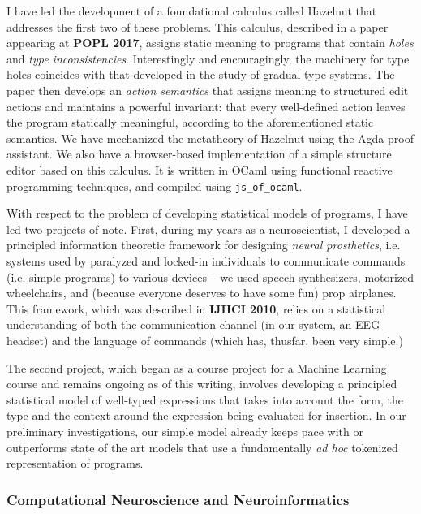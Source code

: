 \documentclass[10pt]{article}
\let\li\lstinline
\begin{document}
I have led the development of a foundational calculus called Hazelnut that addresses the first two of these problems. This calculus, described in a paper appearing at \textbf{POPL 2017}, assigns static meaning to programs that contain \emph{holes} and \emph{type inconsistencies}. Interestingly and encouragingly, the machinery for type holes coincides with that developed in the study of gradual type systems. The paper then develops an \emph{action semantics} that assigns meaning to structured edit actions and maintains a powerful invariant: that every well-defined action leaves the program statically meaningful, according to the aforementioned static semantics. We have mechanized the metatheory of Hazelnut using the Agda proof assistant. We also have a browser-based implementation of a simple {structure editor} based on this calculus. It is written in OCaml using functional reactive programming techniques, and compiled using \li{js_of_ocaml}.

With respect to the problem of developing statistical models of programs, I have led two projects of note. 
First, during my years as a neuroscientist, I developed a principled information theoretic framework for designing \emph{neural prosthetics}, i.e. systems used by paralyzed and locked-in individuals to communicate commands (i.e. simple programs) to various devices -- we used speech synthesizers, motorized wheelchairs, and (because everyone deserves to have some fun) prop airplanes. This framework, which was described in \textbf{IJHCI 2010}, relies on a statistical understanding of both the communication channel (in our system, an EEG headset) and  the language of commands (which has, thusfar, been very simple.)

The second project, which began as a course project for a Machine Learning course and remains ongoing as of this writing, involves developing a principled statistical model of well-typed expressions that takes into account the form, the type and the context around the expression being evaluated for insertion. In our preliminary investigations, our simple model already keeps pace with or outperforms state of the art models that use a fundamentally \emph{ad hoc} tokenized representation of programs. %



\subsubsection*{Computational Neuroscience and Neuroinformatics}
\end{document}
